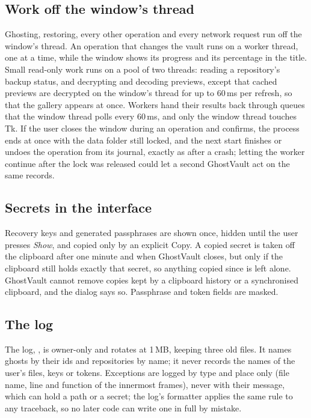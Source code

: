 \subsection{Work off the window's thread}
Ghosting, restoring, every other operation and every network request run off the window's thread.
An operation that changes the vault runs on a worker thread, one at a time, while the window shows its progress and its
percentage in the title. Small read-only work runs on a pool of two threads: reading a repository's
backup status, and decrypting and decoding previews, except that cached previews are decrypted on the
window's thread for up to 60\,ms per refresh, so that the gallery appears at once. Workers hand their results back through queues that the window thread polls every
60\,ms, and only the window thread touches Tk. If the user closes the window during an operation and
confirms, the process ends at once with the data folder still locked, and the next start finishes or
undoes the operation from its journal, exactly as after a crash; letting the worker continue after
the lock was released could let a second GhostVault act on the same records.

\subsection{Secrets in the interface}
Recovery keys and generated passphrases are shown once, hidden until the user presses \emph{Show},
and copied only by an explicit Copy. A copied secret is taken off the clipboard after one minute and
when GhostVault closes, but only if the clipboard still holds exactly that secret, so anything copied
since is left alone. GhostVault cannot remove copies kept by a clipboard history or a synchronised
clipboard, and the dialog says so. Passphrase and token fields are masked.

\subsection{The log}
The log, , is owner-only and rotates at 1\,MB, keeping three old files. It
names ghosts by their ids and repositories by name; it never records the names of the user's files,
keys or tokens. Exceptions are logged by type and place only (file name, line and function of the
innermost frames), never with their message, which can hold a path or a secret; the log's formatter
applies the same rule to any traceback, so no later code can write one in full by mistake.

